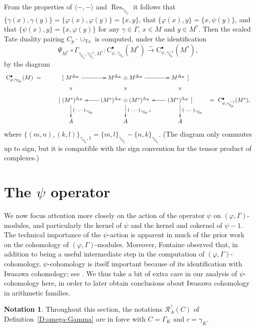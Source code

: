 \documentclass[12pt]{article}
\theoremstyle{definition}
\newtheorem{notation}[theorem]{Notation}
\numberwithin{equation}{theorem}
\newcommand{\calR}{\mathcal{R}}
\newcommand{\QQ}{\mathbb{Q}}
\newcommand{\rmC}{\mathrm{C}}
\def\Qp{\QQ_p}
\newcommand{\Ta}{\mathrm{Ta}}
\DeclareMathOperator{\Res}{Res}
\begin{document}
From the properties of $\langle-,-\rangle$ and $\Res_{\gamma_{\Qp}}$
it follows that $\{\gamma(x), \gamma(y)\} = \{\varphi(x), \varphi(y)\}
= \{x,y\}$, that $\{\varphi(x), y\} = \{x, \psi(y)\}$, and that
$\{\psi(x), y\} = \{x, \varphi(y)\}$ for any $\gamma \in \Gamma$, $x
\in M$ and $y \in M^*$.  Then the scaled Tate duality pairing $C_p
\cdot \cup_\Ta$ is computed, under the identification
\[
\Psi_{M^*} \circ \Gamma_{\gamma_{\Qp},\gamma_{\Qp}^{-1},M^*} :
\rmC_{\varphi,\gamma_{\Qp}}^\bullet(M^*)
\stackrel\sim\to
\rmC_{\psi,\gamma_{\Qp}^{-1}}^\bullet(M^*),
\]
by the diagram
\[
\xymatrix@R=2pt{
\rmC^\bullet_{\varphi, \gamma_{\Qp}}(M)\ = &
[\ M^{\Delta_K} \ar[r] & M^{\Delta_K} \oplus M^{\Delta_K} \ar[r] & M^{\Delta_K}\ ] \\
&\times & \times & \times\\
& [\ (M^*)^{\Delta_K} \ar[ddd]^{\{-,-\}_{\gamma_{\Qp}}} & (M^*)^{\Delta_K} \oplus (M^*)^{\Delta_K} \ar[l]\ar[ddd]^{\{-,-\}_{\gamma_{\Qp},1}} &(M^*)^{\Delta_K}\ ]\ar[ddd]^{\{-,-\}_{\gamma_{\Qp}}} \ar[l]&=\ \rmC^\bullet_{\psi, \gamma_{\Qp}^{-1}}(M^*),\\
\\ \\
& A&A&A
}
\]
where $\{(m,n),(k,l)\}_{\gamma_{\Qp},1} =
\{m,l\}_{\gamma_{\Qp}}-\{n,k\}_{\gamma_{\Qp}}$.  (The diagram only
commutes up to sign, but it is compatible with the sign convention for
the tensor product of complexes.)


\section{The $\psi$ operator}
\label{S:psi operator}

\setcounter{theorem}{0}

We now focus attention more closely on the action of the operator
$\psi$ on $(\varphi, \Gamma)$-modules, and particularly the kernel of
$\psi$ and the kernel and cokernel of $\psi-1$. The technical
importance of the $\psi$-action is apparent in much of the prior work
on the cohomology of $(\varphi, \Gamma)$-modules. Moreover, Fontaine
observed that, in addition to being a useful intermediate step in the
computation of $(\varphi, \Gamma)$-cohomology, $\psi$-cohomology is
itself important because of its identification with Iwasawa
cohomology; see \cite{cherbonnier-colmez}. We thus take a bit of extra
care in our analysis of $\psi$-cohomology here, in order to later
obtain conclusions about Iwasawa cohomology in arithmetic families.

\begin{notation}
\label{N:Gamma_n}
Throughout this section, the notations $\calR_A^?(C)$ of
Definition~\ref{D:omega-Gamma} are in force with $C = \Gamma_K$ and
$c=\gamma_K$.
\end{notation}
\end{document}

